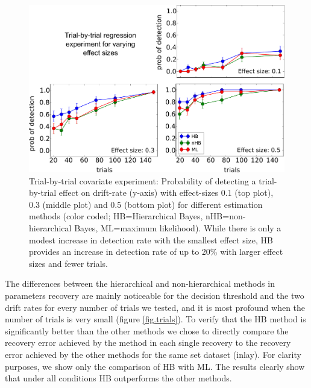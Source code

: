 \documentclass[letterpaper,10pt,english]{article}
\begin{document}
\begin{figure}
  \includegraphics[width=\columnwidth]{fig8.pdf}
\caption{Trial-by-trial covariate experiment: Probability of detecting
a trial-by-trial effect on drift-rate (y-axis) with effect-sizes 0.1
(top plot), 0.3 (middle plot) and 0.5 (bottom plot) for different
estimation methods (color coded; HB=Hierarchical Bayes,
nHB=non-hierarchical Bayes, ML=maximum likelihood). While there is
only a modest increase in detection rate with the smallest effect
size, HB provides an increase in detection rate of up to 20\% with
larger effect sizes and fewer trials.}
\label{fig.regress}
\end{figure}

The differences between the hierarchical and non-hierarchical methods in parameters recovery are mainly noticeable for the decision threshold and the two drift rates for every number of trials we tested, and it is most profound when the number of trials is very small (figure \ref{fig.trials}). To verify that the HB method is significantly better than the other methods we chose to directly compare the recovery error achieved by the method in each single recovery to the recovery error achieved by the other methods for the same set dataset (inlay). For clarity purposes, we show only the comparison of HB with ML. The results clearly show that under all conditions HB outperforms the other methods.
\end{document}
